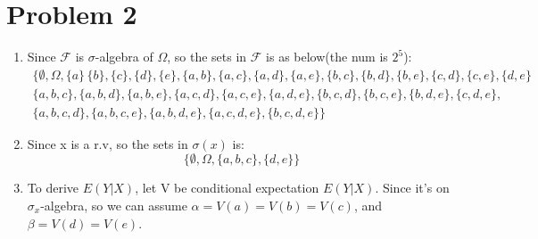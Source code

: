 \documentclass[11pt]{article} %
\begin{document}
\section*{Problem 2}
\begin{enumerate}[(1)]
    \item Since $\mathcal{F}$ is $\sigma$-algebra of $\Omega$, so the sets in $\mathcal{F}$ is as below(the num is $2^5$):
    \begin{equation*}
        \begin{split}        
        \{\emptyset, \Omega, \{a\}\,\{b\},\{c\},\{d\},\{e\},\{a,b\},\{a,c\},\{a,d\},\{a,e\},\{b,c\},\{b,d\},\{b,e\},\{c,d\},\{c,e\},\{d,e\}\\
        \{a,b,c\}, \{a,b,d\},\{a,b,e\},\{a,c,d\},\{a,c,e\},\{a,d,e\},\{b,c,d\},\{b,c,e\},\{b,d,e\},\{c,d,e\},\\
        \{a,b,c,d\},\{a,b,c,e\},\{a,b,d,e\},\{a,c,d,e\},\{b,c,d,e\}  \}
        \end{split}
    \end{equation*}

    \item Since x is a r.v, so the sets in $\sigma(x)$ is:
    \begin{equation*}
        \{\emptyset, \Omega, \{a,b,c\},\{d,e\}\}
    \end{equation*}

    \item To derive $E(Y|X)$, let V be conditional expectation $E(Y|X)$. Since it's on $\sigma_x$-algebra, so we can assume
    $\alpha = V(a)=V(b)=V(c)$, and $\beta = V(d) = V(e)$.
    

\end{enumerate}
\end{document}
